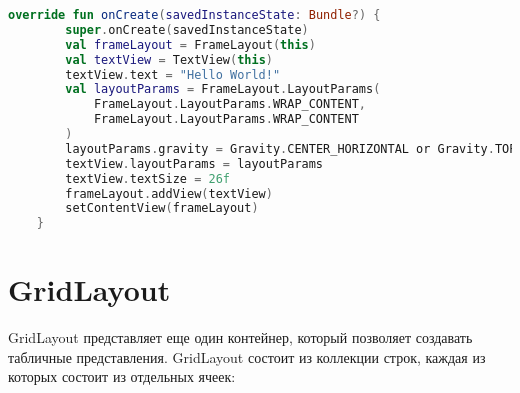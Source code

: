\begin{lstlisting}[language=Kotlin, caption=\leftline{Kotlin}, label=lst:Программное создание FrameLayout]
override fun onCreate(savedInstanceState: Bundle?) {
        super.onCreate(savedInstanceState)
        val frameLayout = FrameLayout(this)
        val textView = TextView(this)
        textView.text = "Hello World!"
        val layoutParams = FrameLayout.LayoutParams(
            FrameLayout.LayoutParams.WRAP_CONTENT,
            FrameLayout.LayoutParams.WRAP_CONTENT
        )
        layoutParams.gravity = Gravity.CENTER_HORIZONTAL or Gravity.TOP
        textView.layoutParams = layoutParams
        textView.textSize = 26f
        frameLayout.addView(textView)
        setContentView(frameLayout)
    }
\end{lstlisting}

\section{GridLayout}
GridLayout представляет еще один контейнер, который позволяет создавать
табличные представления. GridLayout состоит из коллекции строк, каждая из
которых состоит из отдельных ячеек:

